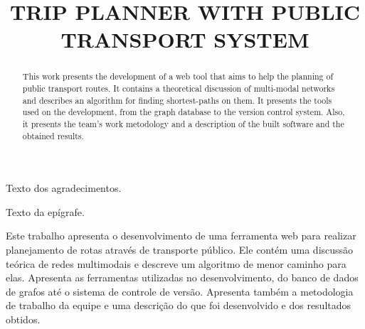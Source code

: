 \documentclass[openright]{normas-utf-tex} %
\title{\MakeUppercase{Trip Planner with Public Transport System}} %
\begin{document}
\capa %
\folhaderosto %

\begin{agradecimentos}
Texto dos agradecimentos.
\end{agradecimentos}

\begin{epigrafe}
Texto da ep\'igrafe.
\end{epigrafe}

\begin{resumo}
Este trabalho apresenta o desenvolvimento de uma ferramenta web para realizar planejamento de rotas através de transporte público. Ele contém uma discussão teórica de redes multimodais e descreve um algoritmo de menor caminho para elas. Apresenta as ferramentas utilizadas no desenvolvimento, do banco de dados de grafos até o sistema de controle de versão. Apresenta também a metodologia de trabalho da equipe e uma descrição do que foi desenvolvido e dos resultados obtidos.
\end{resumo}

\begin{abstract}
This work presents the development of a web tool that aims to help the planning of public transport routes. It contains a theoretical discussion of multi-modal networks and describes an algorithm for finding shortest-paths on them. It presents the tools used on the development, from the graph database to the version control system. Also, it presents the team's work metodology and a description of the built software and the obtained results.
\end{abstract}

\listadefiguras %
\listadetabelas %
\listadesiglas %
\listadesimbolos %

\sumario %



\sloppy
\end{document}
